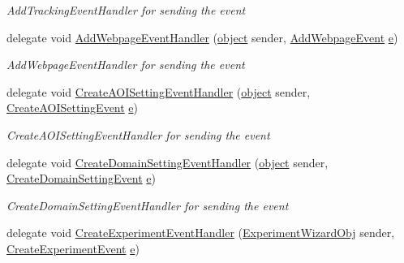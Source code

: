 \begin{DoxyCompactItemize}
\begin{DoxyCompactList}\small\item\em Add\+Tracking\+Event\+Handler for sending the event \end{DoxyCompactList}\item 
delegate void \hyperlink{namespace_web_analyzer_1_1_events_a14e9ad6e502bcecfc5fa91d8b1fd2d1a}{Add\+Webpage\+Event\+Handler} (\hyperlink{_u_i_2_h_t_m_l_resources_2js_2lib_2underscore_8min_8js_aae18b7515bb2bc4137586506e7c0c903}{object} sender, \hyperlink{class_web_analyzer_1_1_events_1_1_add_webpage_event}{Add\+Webpage\+Event} \hyperlink{_u_i_2_h_t_m_l_resources_2js_2lib_2bootstrap_8min_8js_ab5902775854a8b8440bcd25e0fe1c120}{e})
\begin{DoxyCompactList}\small\item\em Add\+Webpage\+Event\+Handler for sending the event \end{DoxyCompactList}\item 
delegate void \hyperlink{namespace_web_analyzer_1_1_events_a1da12d77ad447a64e9f63c4ce04040ff}{Create\+A\+O\+I\+Setting\+Event\+Handler} (\hyperlink{_u_i_2_h_t_m_l_resources_2js_2lib_2underscore_8min_8js_aae18b7515bb2bc4137586506e7c0c903}{object} sender, \hyperlink{class_web_analyzer_1_1_events_1_1_create_a_o_i_setting_event}{Create\+A\+O\+I\+Setting\+Event} \hyperlink{_u_i_2_h_t_m_l_resources_2js_2lib_2bootstrap_8min_8js_ab5902775854a8b8440bcd25e0fe1c120}{e})
\begin{DoxyCompactList}\small\item\em Create\+A\+O\+I\+Setting\+Event\+Handler for sending the event \end{DoxyCompactList}\item 
delegate void \hyperlink{namespace_web_analyzer_1_1_events_a51e3882127acccb363a75b247db1d884}{Create\+Domain\+Setting\+Event\+Handler} (\hyperlink{_u_i_2_h_t_m_l_resources_2js_2lib_2underscore_8min_8js_aae18b7515bb2bc4137586506e7c0c903}{object} sender, \hyperlink{class_web_analyzer_1_1_events_1_1_create_domain_setting_event}{Create\+Domain\+Setting\+Event} \hyperlink{_u_i_2_h_t_m_l_resources_2js_2lib_2bootstrap_8min_8js_ab5902775854a8b8440bcd25e0fe1c120}{e})
\begin{DoxyCompactList}\small\item\em Create\+Domain\+Setting\+Event\+Handler for sending the event \end{DoxyCompactList}\item 
delegate void \hyperlink{namespace_web_analyzer_1_1_events_a0d98385fddff10a46e47d4df06513bb1}{Create\+Experiment\+Event\+Handler} (\hyperlink{class_web_analyzer_1_1_u_i_1_1_interaction_objects_1_1_experiment_wizard_obj}{Experiment\+Wizard\+Obj} sender, \hyperlink{class_web_analyzer_1_1_events_1_1_create_experiment_event}{Create\+Experiment\+Event} \hyperlink{_u_i_2_h_t_m_l_resources_2js_2lib_2bootstrap_8min_8js_ab5902775854a8b8440bcd25e0fe1c120}{e})

\end{DoxyCompactItemize}
